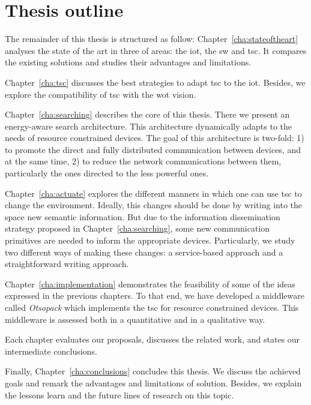 \section{Thesis outline}
\label{sec:Outline}


The remainder of this thesis is structured as follow:
Chapter~\ref{cha:stateoftheart} analyses the state of the art in three of areas:
the \acl{iot}, the \ac{sw} and \acl{tsc}.
It compares the existing solutions and studies their advantages and limitations.

Chapter~\ref{cha:tsc} discusses the best strategies to adapt \ac{tsc} to the \ac{iot}.
Besides, we explore the compatibility of \ac{tsc} with the \ac{wot} vision.

Chapter~\ref{cha:searching} describes the core of this thesis.
There we present an energy-aware search architecture.
This architecture dynamically adapts to the needs of resource constrained devices.
The goal of this architecture is two-fold:
1) to promote the direct and fully distributed communication between devices,
and at the same time,
2) to reduce the network communications between them, particularly the ones directed to the less powerful ones.

Chapter~\ref{cha:actuate} explores the different manners in which one can use \ac{tsc} to change the environment.
Ideally, this changes should be done by writing into the space new semantic information.
But due to the information dissemination strategy proposed in Chapter~\ref{cha:searching},
some new communication primitives are needed to inform the appropriate devices.
Particularly, we study two different ways of making these changes:
a service-based approach and a straightforward writing approach. %

Chapter~\ref{cha:implementation} demonstrates the feasibility of some of the ideas expressed in the previous chapters.
To that end, we have developed a middleware called \emph{Otsopack} which implements the \ac{tsc} for resource constrained devices.
This middleware is assessed both in a quantitative and in a qualitative way. %

Each chapter evaluates our proposals, discusses the related work, and states our intermediate conclusions.

Finally, Chapter~\ref{cha:conclusions} concludes this thesis.
We discuss the achieved goals and remark the advantages and limitations of solution.
Besides, we explain the lessons learn and the future lines of research on this topic.